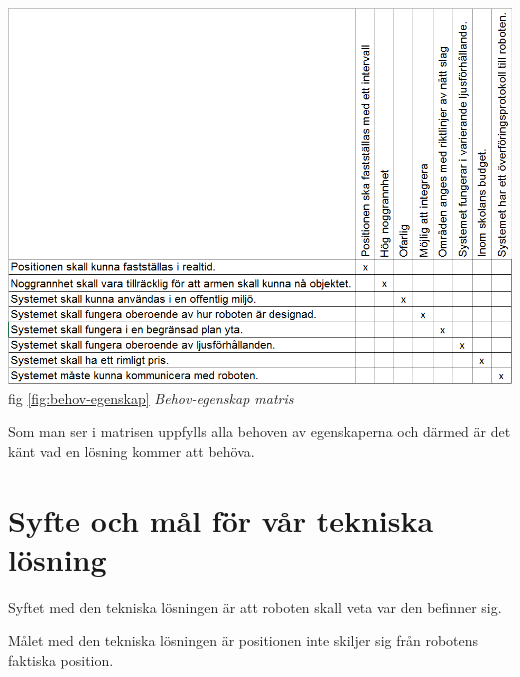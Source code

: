 \documentclass[11pt, a4paper]{report}
\begin{document}
\includegraphics[scale=0.5]{behov-egenskap-matris.PNG}\\
fig \ref{fig:behov-egenskap} \textit{Behov-egenskap matris} %

Som man ser i matrisen uppfylls alla behoven av egenskaperna och därmed är det känt vad en lösning kommer att behöva.



\section{Syfte och mål för vår tekniska lösning}
Syftet med den tekniska lösningen är att roboten skall veta var den befinner sig.

Målet med den tekniska lösningen är positionen inte skiljer sig från robotens faktiska position.

\end{document}
